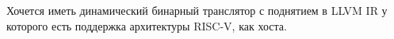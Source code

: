 Хочется иметь динамический бинарный транслятор с поднятием в LLVM IR у которого есть поддержка архитектуры RISC-V, как хоста.








